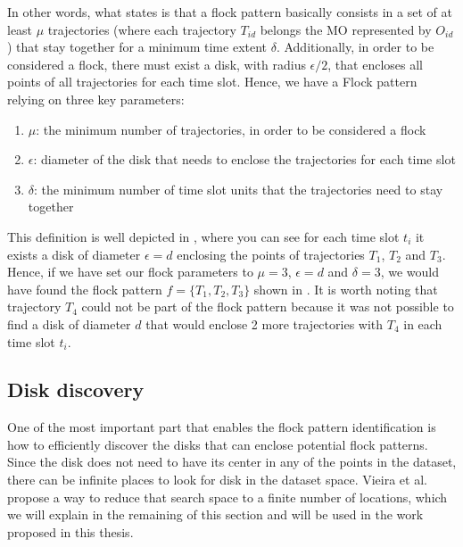 In other words, what  states is that a flock pattern basically consists in a set of at least $\mu$
trajectories (where each trajectory $T_{id}$ belongs the MO represented by $O_{id}$) that stay together for a minimum
time extent $\delta$.  Additionally, in order to be considered a flock, there must exist a disk, with radius
$\epsilon/2$, that encloses all points of all trajectories for each time slot. Hence, we have a Flock pattern relying on
three key parameters:
\begin{enumerate}
    \item $\mu$: the minimum number of trajectories, in order to be considered a flock
    \item $\epsilon$: diameter of the disk that needs to enclose the trajectories for each time slot
    \item $\delta$: the minimum number of time slot units that the trajectories need to stay together
\end{enumerate}

This definition is well depicted in , where you can see for each time slot $t_i$ it exists a disk of
diameter $\epsilon = d$ enclosing the points of trajectories $T_1$, $T_2$ and $T_3$. Hence, if we have set our flock
parameters to $\mu = 3$, $\epsilon = d$ and $\delta = 3$, we would have found the flock pattern $f = \{T_1, T_2, T_3\}$
shown in . It is worth noting that trajectory $T_4$ could not be part of the flock pattern because it
was not possible to find a disk of diameter $d$ that would enclose 2 more trajectories with $T_4$ in each time slot
$t_i$.

\subsection{Disk discovery}

One of the most important part that enables the flock pattern identification is how to efficiently discover the disks
that can enclose potential flock patterns. Since the disk does not need to have its center in any of the points in the
dataset, there can be infinite places to look for disk in the dataset space. Vieira et al. \citep{vieira} propose a way
to reduce that search space to a finite number of locations, which we will explain in the remaining of this section and
will be used in the work proposed in this thesis.

